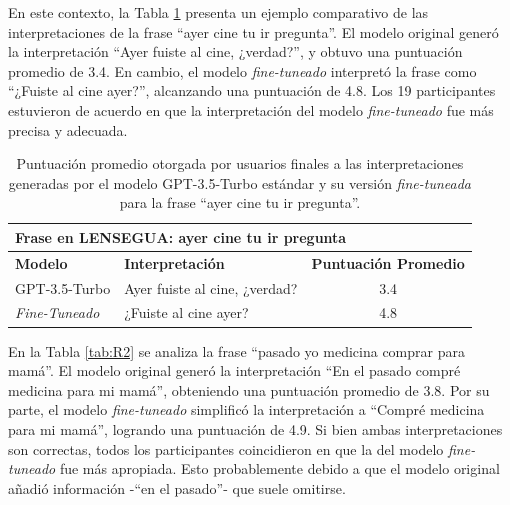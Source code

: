 En este contexto, la Tabla \ref{tab:R1} presenta un ejemplo comparativo de las interpretaciones de la frase “ayer cine tu ir pregunta”. El modelo original generó la interpretación “Ayer fuiste al cine, ¿verdad?”, y obtuvo una puntuación promedio de 3.4. En cambio, el modelo \textit{fine-tuneado} interpretó la frase como “¿Fuiste al cine ayer?”, alcanzando una puntuación de 4.8. Los 19 participantes estuvieron de acuerdo en que la interpretación del modelo \textit{fine-tuneado} fue más precisa y adecuada.

\vspace{0.5cm}
\begin{table}[H]
\centering
    \begin{tabular}{|l|p{7cm}|c|}
        \hline
        \multicolumn{3}{|l|}{\textbf{Frase en LENSEGUA:} ayer cine tu ir pregunta} \\ \hline \hline
        \textbf{Modelo} & \textbf{Interpretación} & \textbf{Puntuación Promedio} \\ \hline
        GPT-3.5-Turbo & Ayer fuiste al cine, ¿verdad? & 3.4 \\ \hline
        \textit{Fine-Tuneado} & ¿Fuiste al cine ayer? & 4.8 \\ \hline
    \end{tabular}
    \caption{Puntuación promedio otorgada por usuarios finales a las interpretaciones generadas por el modelo GPT-3.5-Turbo estándar y su versión \textit{fine-tuneada} para la frase “ayer cine tu ir pregunta”.}
    \label{tab:R1}
\end{table}

En la Tabla \ref{tab:R2} se analiza la frase “pasado yo medicina comprar para mamá”. El modelo original generó la interpretación “En el pasado compré medicina para mi mamá”, obteniendo una puntuación promedio de 3.8. Por su parte, el modelo \textit{fine-tuneado} simplificó la interpretación a “Compré medicina para mi mamá”, logrando una puntuación de 4.9. Si bien ambas interpretaciones son correctas, todos los participantes coincidieron en que la del modelo \textit{fine-tuneado} fue más apropiada. Esto probablemente debido a que el modelo original añadió información -“en el pasado”- que suele omitirse.

